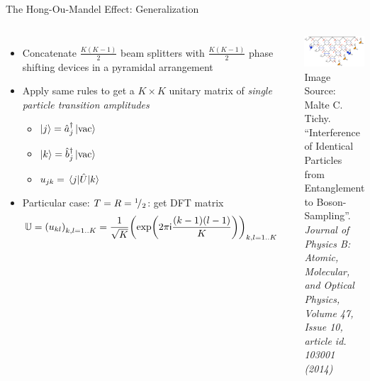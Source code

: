 \begin{frame}[t]{The Hong-Ou-Mandel Effect: Generalization}
%
\begin{columns}
\begin{itemize}
\item Concatenate $\frac{K(K-1)}{2}$ beam splitters with $\frac{K(K-1)}{2}$ phase shifting devices in a pyramidal arrangement
\item Apply same rules to get a $K \times K$ unitary matrix \matU of \emph{single particle transition amplitudes}
	\begin{itemize}
	\item $\ket{j} = \cre_j \vac$
	\item $\ket{k} = \cre[b]_j \vac$
	\item $u_{jk} = \matrixel{j}{\opU}{k}$
	\end{itemize}
\item Particular case: $T = R = \smallfrac{1}{2}$: get DFT matrix
	\begin{align*}
		\matU
	=
		\qty( u_{kl} )_{k, l = 1..K}
	&=
		\frac{1}{\sqrt{K}}
		\qty( \exp(2\pi\iunit \frac{(k-1)(l-1)}{K}) )_{k, l = 1..K}
	\label{eqn:DefDFT}
	\end{align*}
\end{itemize}
%
%
	\includegraphics[width=\linewidth]{./gfx/HOM-full}
	{\scriptsize
		Image Source:\\
		Malte C. Tichy. \enquote{Interference of Identical Particles from Entanglement to Boson-Sampling}.
		\emph{Journal of Physics B: Atomic, Molecular, and Optical Physics, Volume 47, Issue 10, article id. 103001 (2014)}
	}
\end{columns}
%
\end{frame}



